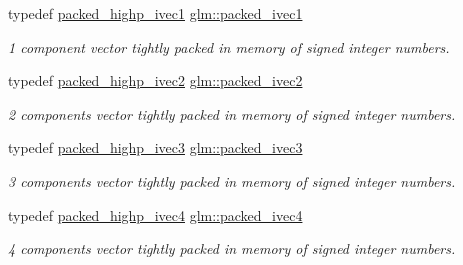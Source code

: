 \begin{DoxyCompactItemize}
typedef \hyperlink{group__gtc__type__aligned_ga7fde67656fb5726169114054992f0a3f}{packed\+\_\+highp\+\_\+ivec1} \hyperlink{group__gtc__type__aligned_gaed29e084c549e66663667ea4127b30a5}{glm\+::packed\+\_\+ivec1}
\begin{DoxyCompactList}\small\item\em 1 component vector tightly packed in memory of signed integer numbers. \end{DoxyCompactList}\item 
\mbox{\label{group__gtc__type__aligned_gabc173f3a8e93f2970df6704371541da1}} 
typedef \hyperlink{group__gtc__type__aligned_gae362d70a8be88cc43b6c1ec0992e73db}{packed\+\_\+highp\+\_\+ivec2} \hyperlink{group__gtc__type__aligned_gabc173f3a8e93f2970df6704371541da1}{glm\+::packed\+\_\+ivec2}
\begin{DoxyCompactList}\small\item\em 2 components vector tightly packed in memory of signed integer numbers. \end{DoxyCompactList}\item 
\mbox{\label{group__gtc__type__aligned_gae3121f35a569fd14475ff5f4d28bd98e}} 
typedef \hyperlink{group__gtc__type__aligned_ga56b9f0123506edc416bbcf957d3ce678}{packed\+\_\+highp\+\_\+ivec3} \hyperlink{group__gtc__type__aligned_gae3121f35a569fd14475ff5f4d28bd98e}{glm\+::packed\+\_\+ivec3}
\begin{DoxyCompactList}\small\item\em 3 components vector tightly packed in memory of signed integer numbers. \end{DoxyCompactList}\item 
\mbox{\label{group__gtc__type__aligned_gaf87b2eccca075255f5ed368dfb1ecc31}} 
typedef \hyperlink{group__gtc__type__aligned_gabf988b7dc66612bc1d4c9ce44d5b5642}{packed\+\_\+highp\+\_\+ivec4} \hyperlink{group__gtc__type__aligned_gaf87b2eccca075255f5ed368dfb1ecc31}{glm\+::packed\+\_\+ivec4}
\begin{DoxyCompactList}\small\item\em 4 components vector tightly packed in memory of signed integer numbers. \end{DoxyCompactList}\item 
\mbox{\label{group__gtc__type__aligned_gab0fbe9830a7129d9135b558b30eed930}} 

\end{DoxyCompactItemize}
